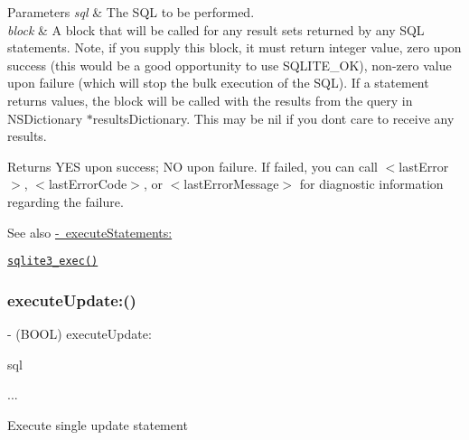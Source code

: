 \begin{DoxyParams}{Parameters}
{\em sql} & The S\+QL to be performed. \\
\hline
{\em block} & A block that will be called for any result sets returned by any S\+QL statements. Note, if you supply this block, it must return integer value, zero upon success (this would be a good opportunity to use S\+Q\+L\+I\+T\+E\+\_\+\+OK), non-\/zero value upon failure (which will stop the bulk execution of the S\+QL). If a statement returns values, the block will be called with the results from the query in N\+S\+Dictionary $\ast$results\+Dictionary. This may be {\ttfamily nil} if you don\textquotesingle{}t care to receive any results.\\
\hline
\end{DoxyParams}
\begin{DoxyReturn}{Returns}
{\ttfamily Y\+ES} upon success; {\ttfamily NO} upon failure. If failed, you can call {\ttfamily $<$last\+Error$>$}, {\ttfamily $<$last\+Error\+Code$>$}, or {\ttfamily $<$last\+Error\+Message$>$} for diagnostic information regarding the failure.
\end{DoxyReturn}
\begin{DoxySeeAlso}{See also}
\mbox{\hyperlink{interface_o_p_t_l_y_f_m_d_b_database_ad8c3bdc64c602dac7827a4f560928168}{-\/ execute\+Statements\+:}} 

\href{http://sqlite.org/c3ref/exec.html}{\tt sqlite3\+\_\+exec()} 
\end{DoxySeeAlso}
\mbox{\label{interface_o_p_t_l_y_f_m_d_b_database_aacce81f6c3456a804e1d558462bca313}} 
\subsubsection{\texorpdfstring{execute\+Update\+:()}{executeUpdate:()}}
{\footnotesize\ttfamily -\/ (B\+O\+OL) execute\+Update\+: \begin{DoxyParamCaption}\item[{(N\+S\+String$\ast$)}]{sql }\item[{,}]{... }\end{DoxyParamCaption}}

Execute single update statement

